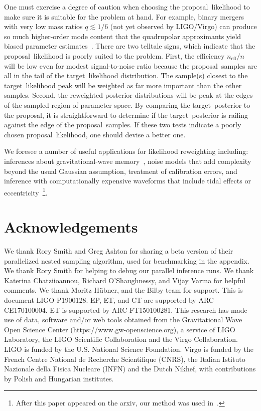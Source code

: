 \documentclass[prd,superscriptaddress,twocolumn,nopreprintnumbers,floatfix,longbibliography]{revtex4}
\newcommand{\proposal}{proposal}
\newcommand{\target}{target}
\begin{document}
One must exercise a degree of caution when choosing the \proposal\ likelihood to make sure it is suitable for the problem at hand.
For example, binary mergers with very low mass ratios $q\lesssim 1/6$ (not yet observed by LIGO/Virgo) can produce so much higher-order mode content that the quadrupolar approximants yield biased parameter estimates~\cite{bustillo,varma}.
There are two telltale signs, which indicate that the \proposal\ likelihood is poorly suited to the problem.
First, the efficiency $n_\text{eff}/n$ will be low even for modest signal-to-noise ratio because the \proposal\ samples are all in the tail of the \target\ likelihood distribution.
The sample(s) closest to the \target\ likelihood peak will be weighted as far more important than the other samples.
Second, the reweighted posterior distributions will be peak at the edges of the sampled region of parameter space.
By comparing the \target\ posterior to the \proposal, it is straightforward to determine if the \target\ posterior is railing against the edge of the \proposal\ samples.
If these two tests indicate a poorly chosen \proposal\ likelihood, one should devise a better one.

We foresee a number of useful applications for likelihood reweighting including: inferences about gravitational-wave memory~\cite{memory}, noise models that add complexity beyond the usual Gaussian assumption, treatment of calibration errors, and inference with computationally expensive waveforms that include tidal effects or eccentricity~\footnote{After this paper appeared on the arxiv, our method was used in~\cite{isobel}.}.


\section{Acknowledgements}
We thank Rory Smith and Greg Ashton for sharing a beta version of their parallelized nested sampling algorithm, used for benchmarking in the appendix.
We thank Rory Smith for helping to debug our parallel inference runs.
We thank Katerina Chatziioannou, Richard O'Shaughnessy, and Vijay Varma for helpful comments.
We thank Moritz H{\"u}bner, and the {\sc Bilby} team for support.
This is document LIGO-P1900128.
EP, ET, and CT are supported by ARC CE170100004.
ET is supported by ARC FT150100281.
This research has made use of data, software and/or web tools obtained from the Gravitational Wave Open Science Center (https://www.gw-openscience.org), a service of LIGO Laboratory, the LIGO Scientific Collaboration and the Virgo Collaboration. LIGO is funded by the U.S. National Science Foundation. Virgo is funded by the French Centre National de Recherche Scientifique (CNRS), the Italian Istituto Nazionale della Fisica Nucleare (INFN) and the Dutch Nikhef, with contributions by Polish and Hungarian institutes.
\end{document}
